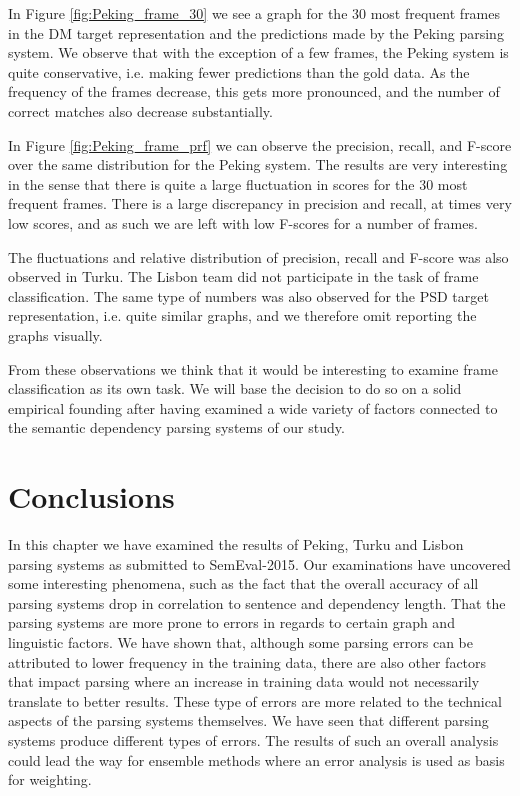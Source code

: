 In Figure \ref{fig:Peking_frame_30} we see a graph for the 30 most frequent frames in the DM target representation and the predictions made by the Peking parsing system. We observe that with the exception of a few frames, the Peking system is quite conservative, i.e. making fewer predictions than the gold data. As the frequency of the frames decrease, this gets more pronounced, and the number of correct matches also decrease substantially.

In Figure \ref{fig:Peking_frame_prf} we can observe the precision, recall, and F-score over the same distribution for the Peking system. The results are very interesting in the sense that there is quite a large fluctuation in scores for the 30 most frequent frames. There is a large discrepancy in precision and recall, at times very low scores, and as such we are left with low F-scores for a number of frames.

The fluctuations and relative distribution of precision, recall and F-score was also observed in Turku. The Lisbon team did not participate in the task of frame classification. The same type of numbers was also observed for the PSD target representation, i.e. quite similar graphs, and we therefore omit reporting the graphs visually.

From these observations we think that it would be interesting to examine frame classification as its own task. We will base the decision to do so on a solid empirical founding after having examined a wide variety of factors connected to the semantic dependency parsing systems of our study.


\section{Conclusions}

In this chapter we have examined the results of Peking, Turku and Lisbon parsing systems as submitted to SemEval-2015. Our examinations have uncovered some interesting phenomena, such as the fact that the overall accuracy of all parsing systems drop in correlation to sentence and dependency length. That the parsing systems are more prone to errors in regards to certain graph and linguistic factors. We have shown that, although some parsing errors can be attributed to lower frequency in the training data, there are also other factors that impact parsing where an increase in training data would not necessarily translate to better results. These type of errors are more related to the technical aspects of the parsing systems themselves. We have seen that different parsing systems produce different types of errors. The results of such an overall analysis could lead the way for ensemble methods where an error analysis is used as basis for weighting.

